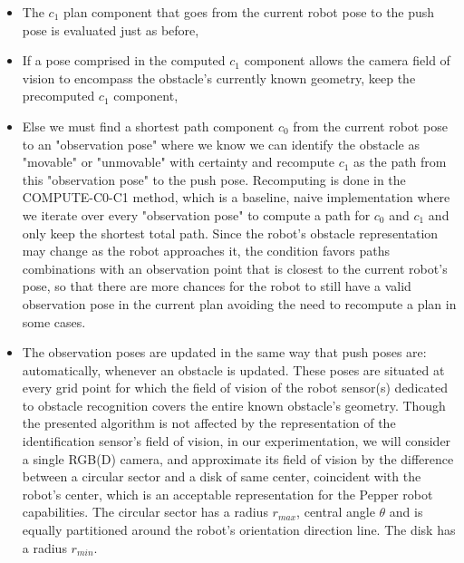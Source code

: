 

\begin{itemize}
  \item The $c_{1}$ plan component that goes from the current robot pose to the push pose is evaluated just as before,
  \item If a pose comprised in the computed $c_{1}$ component allows the camera field of vision to encompass the obstacle's currently known geometry, keep the precomputed $c_{1}$ component,
  \item Else we must find a shortest path component $c_{0}$ from the current robot pose to an "observation pose" where we know we can identify the obstacle as "movable" or "unmovable" with certainty and recompute $c_{1}$ as the path from this "observation pose" to the push pose. Recomputing is done in the COMPUTE-C0-C1 method, which is a baseline, naive implementation where we iterate over every "observation pose" to compute a path for $c_{0}$ and $c_{1}$ and only keep the shortest total path. Since the robot's obstacle representation may change as the robot approaches it, the condition favors paths combinations with an observation point that is closest to the current robot's pose, so that there are more chances for the robot to still have a valid observation pose in the current plan avoiding the need to recompute a plan in some cases.
  \item The observation poses are updated in the same way that push poses are: automatically, whenever an obstacle is updated. These poses are situated at every grid point for which the field of vision of the robot sensor(s) dedicated to obstacle recognition covers the entire known obstacle's geometry. Though the presented algorithm is not affected by the representation of the identification sensor's field of vision, in our experimentation, we will consider a single RGB(D) camera, and approximate its field of vision by the difference between a circular sector and a disk of same center, coincident with the robot's center, which is an acceptable representation for the Pepper robot capabilities. The circular sector has a radius $r_{max}$, central angle $\theta$ and is equally partitioned around the robot's orientation direction line. The disk has a radius $r_{min}$.
\end{itemize}

